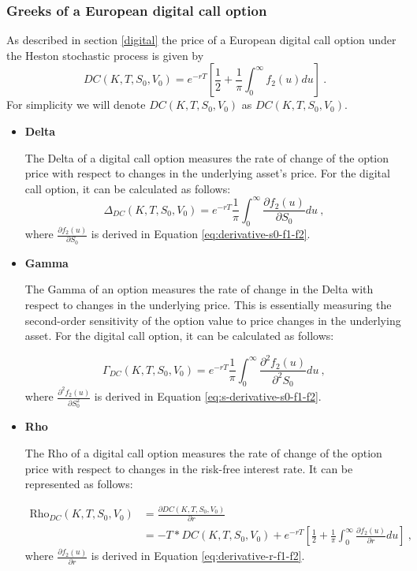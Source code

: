 



\subsubsection{Greeks of a European digital call option}
As described in section \ref{digital} the price of a European digital call option under the Heston stochastic process is given by
$$
DC(K,T, S_0, V_0) = e^{-r T}  \left[ \frac{1}{2} + \frac{1}{\pi}\int_0^{\infty}f_2(u) du \right]  \ .
$$
For simplicity we will denote $DC(K,T, S_0, V_0)$ as $DC(K,T, S_0, V_0)$.

\begin{itemize}
\item \textbf{Delta} 

The Delta of a digital call option measures the rate of change of the option price with respect to changes in the underlying asset's price. For the digital call option, it can be calculated as follows:
$$
\Delta_{DC}(K,T,S_0,V_0) =  e^{-r T}   \frac{1}{\pi}\int_0^{\infty}  \frac{\partial f_2(u)}{\partial S_0}  du  \ , 
$$
where $\frac{\partial f_2(u)}{\partial S_0}$ is derived in Equation \ref{eq:derivative-s0-f1-f2}.


\item \textbf{Gamma} 

The Gamma of an option measures the rate of change in the Delta with respect to changes in the underlying price. This is essentially measuring the second-order sensitivity of the option value to price changes in the underlying asset. For the digital call option, it can be calculated as follows:

$$
\Gamma_{DC}(K,T,S_0,V_0) =  e^{-r T}   \frac{1}{\pi}\int_0^{\infty}  \frac{\partial^2 f_2(u)}{\partial^2 S_0}  du \ , 
$$
where $\frac{\partial^2 f_2(u)}{\partial S_0^2}$ is derived in Equation \ref{eq:s-derivative-s0-f1-f2}.


\item \textbf{Rho} 

The Rho of a digital call option measures the rate of change of the option price with respect to changes in the risk-free interest rate. It can be represented as follows:


$$
\begin{aligned}
\text{Rho}_{DC}(K,T,S_0,V_0) &= 
\frac{ \partial DC(K,T, S_0, V_0) }{\partial r} 
\\ &=
-T * DC(K,T, S_0, V_0) + e^{-r T}  \left[ \frac{1}{2} + \frac{1}{\pi}\int_0^{\infty} \frac{ \partial f_2(u)}{\partial r}  du \right] \ ,
\end{aligned}
$$
where $\frac{\partial f_2(u)}{\partial r}$ is derived in Equation \ref{eq:derivative-r-f1-f2}.





\end{itemize}
